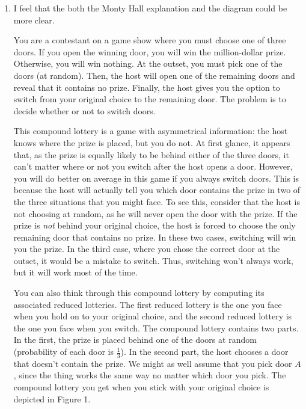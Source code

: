 \documentclass[12pt, fleqn]{article}
\begin{document}
\begin{enumerate}
  \item I feel that the both the Monty Hall explanation and the diagram could be more clear.  

You are a contestant on a game show where you must choose one of three doors.  If you open the winning door, you will win the million-dollar prize.  Otherwise, you will win nothing.  At the outset, you must pick one of the doors (at random).  Then, the host will open one of the remaining doors and reveal that it contains no prize.  Finally, the host gives you the option to switch from your original choice to the remaining door.  The problem is to decide whether or not to switch doors.  

This compound lottery is a game with asymmetrical information: the host knows where the prize is placed, but you do not.  At first glance, it appears that, as the prize is equally likely to be behind either of the three doors, it can't matter where or not you switch after the host opens a door.  However, you will do better on average in this game if you always switch doors.  This is because the host will actually tell you which door contains the prize in two of the three situations that you might face.  To see this, consider that the host is not choosing at random, as he will never open the door with the prize.  If the prize is \emph{not} behind your original choice, the host is forced to choose the only remaining door that contains no prize.  In these two cases, switching will win you the prize.  In the third case, where you chose the correct door at the outset, it would be a mistake to switch.  Thus, switching won't always work, but it will work most of the time.   

You can also think through this compound lottery by computing its associated reduced lotteries.  The first reduced lottery is the one you face when you hold on to your original choice, and the second reduced lottery is the one you face when you switch.  The compound lottery contains two parts.  In the first, the prize is placed behind one of the doors at random (probability of each door is $\frac{1}{3}$).  In the second part, the host chooses a door that doesn't contain the prize.  We might as well
assume that you pick door $A$, since the thing works the same way no matter
which door you pick. The compound lottery you get when you stick with your original
choice is depicted in Figure 1.


\end{enumerate}
\end{document}
